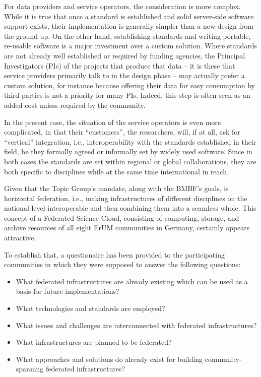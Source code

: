 \documentclass{article}
\begin{document}
For data providers and service operators, the consideration is more
complex.  While it is true that once a standard is established and solid
server-side software support exists, their implementation is generally
simpler than a new design from the ground up.  On the other hand,
establishing standards and writing portable, re-usable software is a
major investment over a custom solution.  Where standards are not
already well established or required by funding agencies, the Principal
Investigators (PIs) of the projects that produce that data --
it is these that service providers primarily talk to in the design phase
-- may actually prefer a custom
solution, for instance because offering their data for easy consumption by
third parties is not a priority for many PIs.  Indeed, this step is
often seen as an added cost unless required by the community.

In the present case, the situation of the service operators is even more
complicated, in that their ``customers'', the researchers, will, if at
all, ask for ``vertical'' integration, i.e., interoperability with
the standards established in their field, be they formally agreed or
informally set by widely used software.  Since in both cases the
standards are set within regional or global collaborations, they are
both specific to disciplines while at the same time international in
reach.

Given that the Topic Group's mandate, along with the BMBF's 
goals, is horizontal federation, i.e., making 
infrastructures of different disciplines on the national level
interoperable and then combining them into a seamless whole.  This
concept of a Federated Science Cloud, consisting of computing,
storage, and archive resources of all eight ErUM communities in Germany,
certainly appears attractive.

To establish that, a questionaire has been provided to the participating communities
in which they were supposed to answer the following questions:


\begin{itemize}
\item What federated infrastructures are already existing which can be
used as a basis for future implementations?
\item What technologies and standards are employed?
\item What issues and challenges are interconnected with federated
infrastructures?
\item What infrastructures are planned to be federated?
\item What approaches and solutions do already exist for building
community-spanning federated infrastructures?
\end{itemize}
\end{document}
